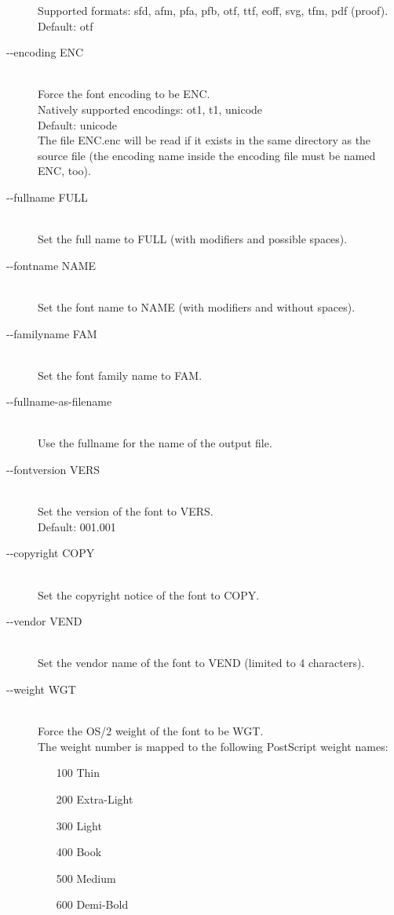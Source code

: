\documentclass{scrartcl}
\begin{document}
\begin{description}
		Supported formats: sfd, afm, pfa, pfb, otf, ttf, eoff, 
		svg, tfm, pdf (proof).\\
		Default: otf
	\item[-{}-encoding ENC ] \hfill \\
		Force the font encoding to be ENC.\\
		Natively supported encodings: ot1, t1, unicode\\
		Default: unicode\\
		The file ENC.enc will be read if it exists in the same directory as the source file (the encoding name inside the encoding file must be named ENC, too).
	\item[-{}-fullname FULL] \hfill \\
		Set the full name to FULL (with modifiers and possible spaces).
	\item[-{}-fontname NAME] \hfill \\
		Set the font name to NAME (with modifiers and without spaces).
	\item[-{}-familyname FAM] \hfill \\
		Set the font family name to FAM.
	\item[-{}-fullname-as-filename] \hfill \\
		Use the fullname for the name of the output file.
	\item[-{}-fontversion VERS] \hfill \\
		Set the version of the font to VERS.\\
		Default: 001.001
	\item[-{}-copyright COPY] \hfill \\
		Set the copyright notice of the font to COPY.
	\item[-{}-vendor VEND] \hfill \\
		Set the vendor name of the font to VEND (limited to 4 characters).
	\item[-{}-weight WGT] \hfill \\
		 Force the OS/2 weight of the font to be WGT.\\
		 The weight number is mapped to the following PostScript weight names:
		 \begin{itemize}
		 	\item[100] Thin
		 	\item[200] Extra-Light
		 	\item[300] Light
		 	\item[400] Book
		 	\item[500] Medium 
		 	\item[600] Demi-Bold

\end{itemize}
\end{description}
\end{document}
